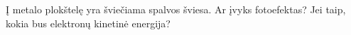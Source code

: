 \question Į {} metalo plokštelę yra šviečiama {} spalvos šviesa. Ar įvyks fotoefektas? Jei taip, kokia bus elektronų kinetinė energija?
